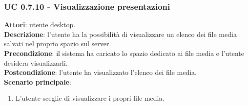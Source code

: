 	\subsubsection{UC 0.7.10 - Visualizzazione presentazioni}{
		\label{uc0.7.10}
		\textbf{Attori}: utente desktop.	\\
		\textbf{Descrizione}: l'utente ha la possibilità di visualizzare un elenco dei file media salvati nel proprio spazio sul server. \\
		\textbf{Precondizione}: il sistema ha caricato lo spazio dedicato ai file media e l'utente desidera visualizzarli.	\\
		\textbf{Postcondizione}: l'utente ha visualizzato l'elenco dei file media.	\\
		\textbf{Scenario principale}:
		\begin{enumerate}
			\item L'utente sceglie di visualizzare i propri file media.
		\end{enumerate}
		}
